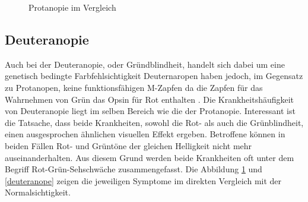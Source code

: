 \documentclass[a4paper]{article}
\begin{document}
\begin{figure}[H]
\centering
{}
\caption{Protanopie im Vergleich}
\label{protanope}
\end{figure}

\subsection*{Deuteranopie}
Auch bei der Deuteranopie, oder Gründblindheit, handelt sich dabei um eine genetisch bedingte Farbfehlsichtigkeit Deuternaropen haben jedoch, im Gegensatz zu Protanopen, keine funktionsfähigen M-Zapfen da die Zapfen für das Wahrnehmen von Grün das Opsin für Rot enthalten \cite{WP-D}. Die Krankheitshäufigkeit von Deuteranopie liegt im selben Bereich wie die der Protanopie. Interessant ist die Tatsache, dass beide Krankheiten, sowohl die Rot- als auch die Grünblindheit, einen ausgesprochen ähnlichen visuellen Effekt ergeben. Betroffene können in beiden Fällen Rot- und Grüntöne der gleichen Helligkeit nicht mehr auseinanderhalten. Aus diesem Grund werden beide Krankheiten oft unter dem Begriff Rot-Grün-Sehschwäche \cite{WP-RG} zusammengefasst. Die Abbildung \ref{protanope} und \ref{deuteranope} zeigen die jeweiligen Symptome im direkten Vergleich mit der Normalsichtigkeit.
\end{document}
